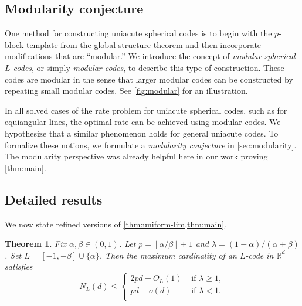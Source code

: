 \documentclass[reqno, 11pt]{amsart}
\newtheorem{theorem}{Theorem}[section]
\theoremstyle{definition}
\theoremstyle{remark}
\newcommand{\floor}[1]{\left\lfloor #1 \right\rfloor}
\newcommand{\RR}{\mathbb{R}}
\begin{document}
\subsection{Modularity conjecture}

One method for constructing uniacute spherical codes is to begin with the $p$-block template from the global structure theorem and then incorporate modifications that are ``modular.'' We introduce the concept of \emph{modular spherical $L$-codes}, or simply \emph{modular codes}, to describe this type of construction. 
These codes are modular in the sense that larger modular codes can be constructed by repeating small modular codes.
See \cref{fig:modular} for an illustration.

In all solved cases of the rate problem for uniacute spherical codes, such as for equiangular lines, the optimal rate can be achieved using modular codes. We hypothesize that a similar phenomenon holds for general uniacute codes. 
To formalize these notions, we formulate a \emph{modularity conjecture} in  \cref{sec:modularity}.
The modularity perspective was already helpful here in our work proving \cref{thm:main}.



\subsection{Detailed results}

We now state refined versions of \cref{thm:uniform-lim,thm:main}.

\begin{theorem}\label{thm:general-upper}
	Fix $\alpha, \beta \in (0,1)$. Let $p = \floor{\alpha/\beta} + 1$ and $\lambda = (1-\alpha)/(\alpha + \beta)$. Set $L = [-1,-\beta] \cup \{\alpha\}$. Then the maximum cardinality of an $L$-code in $\RR^d$ satisfies
\[
    N_L(d) \leq \begin{cases}
        2pd + O_L(1) & \text{ if } \lambda \geq 1,\\
        pd + o(d) & \text{ if } \lambda < 1.\\
    \end{cases}
\]

\end{theorem}
\end{document}
